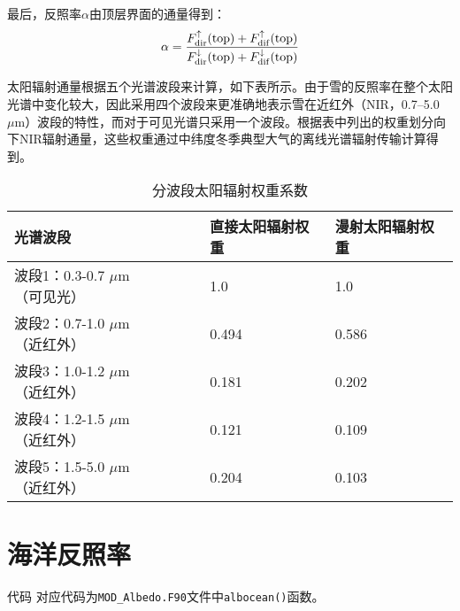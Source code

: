 最后，反照率\(\alpha\)由顶层界面的通量得到：
\begin{equation}
  \alpha = \frac{F_{\mathrm{dir}}^{\uparrow}({\rm top}) + F_{\mathrm{dif}}^{\uparrow}({\rm top})}{F_{\mathrm{dir}}^{\downarrow}({\rm top}) + F_{\mathrm{dif}}^{\downarrow}({\rm top})}
\end{equation}

太阳辐射通量根据五个光谱波段来计算，如下表所示。由于雪的反照率在整个太阳光谱中变化较大，因此采用四个波段来更准确地表示雪在近红外（NIR，0.7--5.0 $\mu \mathrm{m}$）波段的特性，而对于可见光谱只采用一个波段。根据表中列出的权重划分向下NIR辐射通量，这些权重通过中纬度冬季典型大气的离线光谱辐射传输计算得到\citep{briegleb2007delta}。

\begin{table}[htbp]
  \centering
  \caption{分波段太阳辐射权重系数}
  \label{tab:太阳辐射权重系数}
  \begin{tabular}{lll}
    \toprule
    光谱波段                                  & 直接太阳辐射权重 & 漫射太阳辐射权重 \\ \midrule
    波段1：0.3-0.7 $\mu \mathrm{m}$（可见光） & 1.0              & 1.0              \\
    波段2：0.7-1.0 $\mu \mathrm{m}$（近红外） & 0.494            & 0.586            \\
    波段3：1.0-1.2 $\mu \mathrm{m}$（近红外） & 0.181            & 0.202            \\
    波段4：1.2-1.5 $\mu \mathrm{m}$（近红外） & 0.121            & 0.109            \\
    波段5：1.5-5.0 $\mu \mathrm{m}$（近红外） & 0.204            & 0.103            \\ \bottomrule
  \end{tabular}
\end{table}

\section{海洋反照率}\label{海洋反照率}
\begin{mymdframed}{代码}
  对应代码为\texttt{MOD\_Albedo.F90}文件中\texttt{albocean()}函数。
\end{mymdframed}

